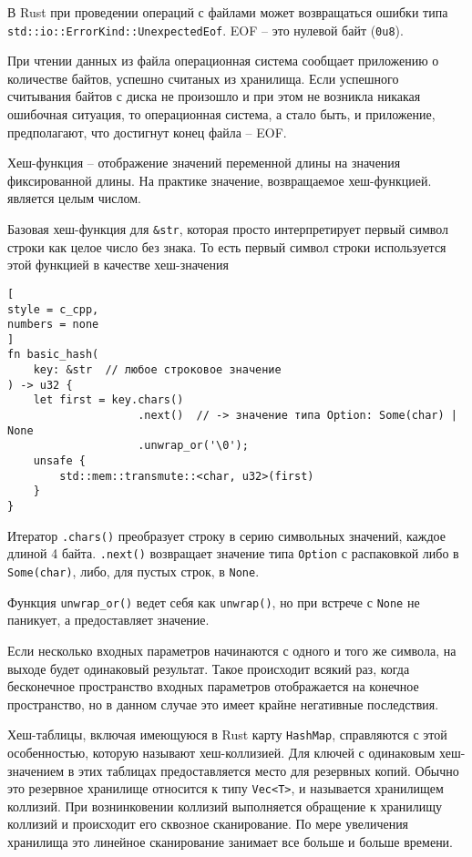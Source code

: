 \documentclass[%
	11pt,
	a4paper,
	utf8,
		]{article}
\begin{document}
В Rust при проведении операций с файлами может возвращаться ошибки типа \verb|std::io::ErrorKind::UnexpectedEof|. EOF -- это нулевой байт (\verb|0u8|).

При чтении данных из файла операционная система сообщает приложению о количестве байтов, успешно считаных из хранилища. Если успешного считывания байтов с диска не произошло и при этом не возникла никакая ошибочная ситуация, то операционная система, а стало быть, и приложение, предполагают, что достигнут конец файла -- EOF.

Хеш-функция -- отображение значений переменной длины на значения фиксированной длины. На практике значение, возвращаемое хеш-функцией. является целым числом.

Базовая хеш-функция для \verb|&str|, которая просто интерпретирует первый символ строки как целое число без знака. То есть первый символ строки используется этой функцией в качестве хеш-значения
\begin{lstlisting}[
style = c_cpp,
numbers = none
]
fn basic_hash(
    key: &str  // любое строковое значение
) -> u32 {
    let first = key.chars()
                    .next()  // -> значение типа Option: Some(char) | None
                    .unwrap_or('\0');
    unsafe {
        std::mem::transmute::<char, u32>(first)
    }
}
\end{lstlisting}

Итератор \verb|.chars()| преобразует строку в серию символьных значений, каждое длиной 4 байта. \verb|.next()| возвращает значение типа \verb|Option| с распаковкой либо в \verb|Some(char)|, либо, для пустых строк, в \verb|None|. 

Функция \verb|unwrap_or()| ведет себя как \verb|unwrap()|, но при встрече с \verb|None| не паникует, а предоставляет значение.

Если несколько входных параметров начинаются с одного и того же символа, на выходе будет одинаковый результат. Такое происходит всякий раз, когда бесконечное пространство входных параметров отображается на конечное пространство, но в данном случае это имеет крайне негативные последствия.

Хеш-таблицы, включая имеющуюся в Rust карту \verb|HashMap|, справляются с этой особенностью, которую называют хеш-коллизией. Для ключей с одинаковым хеш-значением в этих таблицах предоставляется место для резервных копий. Обычно это резервное хранилище относится к типу \verb|Vec<T>|, и называется хранилищем коллизий. При вознинковении коллизий выполняется обращение к хранилищу коллизий и происходит его сквозное сканирование. По мере увеличения хранилища это линейное сканирование занимает все больше и больше времени.
\end{document}
